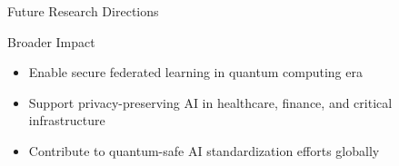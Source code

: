 \documentclass[aspectratio=169,11pt]{beamer}
\begin{document}
\begin{frame}{Future Research Directions}
\begin{block}{Broader Impact}
\begin{itemize}
\item Enable secure federated learning in quantum computing era
\item Support privacy-preserving AI in healthcare, finance, and critical infrastructure
\item Contribute to quantum-safe AI standardization efforts globally
\end{itemize}
\end{block}

\end{frame}
\end{document}
